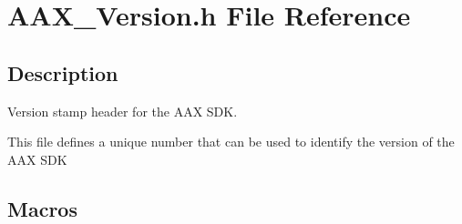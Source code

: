 \hypertarget{a00707}{}\section{A\+A\+X\+\_\+\+Version.\+h File Reference}
\label{a00707}


\subsection{Description}
Version stamp header for the A\+AX S\+DK. 

This file defines a unique number that can be used to identify the version of the A\+AX S\+DK \subsection*{Macros}
